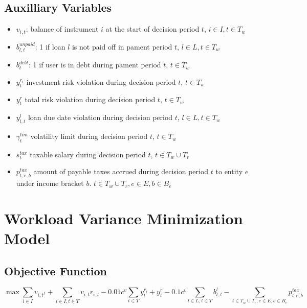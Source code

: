 \documentclass[11pt]{article}
\begin{document}
\subsection{Auxilliary Variables}
\begin{itemize}
    \item $v_{i, t}$: balance of instrument $i$ at the start of decision period $t$, $i \in I, t \in T_w$
    \item $b^{unpaid}_{l, t}$: 1 if loan $l$ is not paid off in pament period $t$, $l \in L, t \in T_w$
    \item $b^{debt}_{t}$: 1 if user is in debt during pament period $t$, $t \in T_w$
    \item $y^{r_i}_{t}$ investment risk violation during decision period $t$, $t \in T_w$
    \item $y^{r}_{t}$ total risk violation during decision period $t$, $t \in T_w$
    \item $y^{l}_{l, t}$ loan due date violation during decision period $t$, $l \in L, t \in T_w$
    \item $\gamma^{lim}_t$ volatility limit during decision period $t$, $t \in T_w$
    \item $s^{tax}_{t}$ taxable salary during decision period $t$, $t \in T_w \cup T_r$
    \item $p^{tax}_{t, e, b}$ amount of payable taxes accrued during decision period $t$ to entity $e$ under income bracket $b$. $t \in T_w \cup T_r, e \in E, b \in B_e$
\end{itemize}


\section{Workload Variance Minimization Model}
\subsection{Objective Function}
\begin{equation}
    \max \sum_{i \in I} v_{i, t^f}
          + \sum_{i \in I, t \in T} v_{i, t} r_{i, t}
          - 0.01 c^v \sum_{t \in T} y^{r_i}_{t} + y^{r}_{t}
          - 0.1 c^v \sum_{l \in L, t \in T} b^{l}_{l, t}
          - \sum_{t \in T_w \cup T_r, e \in E, b \in B_e} p^{tax}_{t, e, b}
\end{equation}
\end{document}
